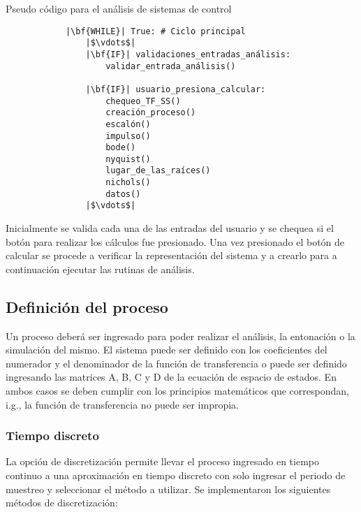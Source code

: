     \begin{longlisting}
        \caption[Pseudo código - Análisis de sistemas de control]{Pseudo código para el análisis de sistemas de control}
        \label{code:analisis}				
        \begin{verbatim}
            |\bf{WHILE}| True: # Ciclo principal
                |$\vdots$|
                |\bf{IF}| validaciones_entradas_análisis:
                    validar_entrada_análisis()
                
                |\bf{IF}| usuario_presiona_calcular:
                    chequeo_TF_SS()
                    creación_proceso()
                    escalón()
                    impulso()
                    bode()
                    nyquist()
                    lugar_de_las_raíces()
                    nichols()
                    datos()
                |$\vdots$|
        \end{verbatim}
    \end{longlisting}

    Inicialmente se valida cada una de las entradas del usuario y se chequea si el botón para realizar los cálculos fue presionado. Una vez presionado el botón de calcular se procede a verificar la representación del sistema y a crearlo para a continuación ejecutar las rutinas de análisis.

    \subsection{Definición del proceso}

        Un proceso deberá ser ingresado para poder realizar el análisis, la entonación o la simulación del mismo. El sistema puede ser definido con los coeficientes del numerador y el denominador de la función de transferencia o puede ser definido ingresando las matrices A, B, C y D de la ecuación de espacio de estados. En ambos casos se deben cumplir con los principios matemáticos que correspondan, i.g., la función de transferencia no puede ser impropia.

    \subsubsection{Tiempo discreto}

        La opción de discretización permite llevar el proceso ingresado en tiempo continuo a una aproximación en tiempo discreto con solo ingresar el periodo de muestreo y seleccionar el método a utilizar. Se implementaron los siguientes métodos de discretización:

